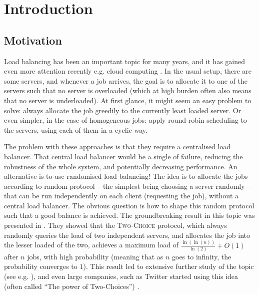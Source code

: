 \chapter{Introduction}\label{introduction}

\ifpdf
    \graphicspath{{Chapter1/Figs/Raster/}{Chapter1/Figs/PDF/}{Chapter1/Figs/}}
\else
    \graphicspath{{Chapter1/Figs/Vector/}{Chapter1/Figs/}}
\fi


\section{Motivation}

Load balancing has been an important topic for many years, and it has gained even more attention recently e.g. cloud computing \cite{mishra2020cloud}. In the usual setup, there are some servers, and whenever a job arrives, the goal is to allocate it to one of the servers such that no server is overloaded (which at high burden often also means that no server is underloaded). At first glance, it might seem an easy problem to solve: always allocate the job greedily to the currently least loaded server. Or even simpler, in the case of homogeneous jobs: apply round-robin scheduling to the servers, using each of them in a cyclic way. 

The problem with these approaches is that they require a centralised load balancer. That central load balancer would be a single of failure, reducing the robustness of the whole system, and potentially decreasing performance. An alternative is to use randomised load balancing! The idea is to allocate the jobs according to random protocol -- the simplest being choosing a server randomly -- that can be run independently on each client (requesting the job), without a central load balancer. The obvious question is how to shape this random protocol such that a good balance is achieved. The groundbreaking result in this topic was presented in \cite{azar1999twochoice}. They showed that the \textsc{Two-Choice} protocol, which always randomly queries the load of two independent servers, and allocates the job into the lesser loaded of the two, achieves a maximum load of $\frac{\ln(\ln(n))}{\ln(2)} + O(1)$ after $n$ jobs, with high probability (meaning that as $n$ goes to infinity, the probability converges to $1$). This result led to extensive further study of the topic (see e.g. \cite{richa2001surveytwochoice}), and even large companies, such as Twitter started using this idea (often called ``The power of Two-Choices'') \cite{anderson2019twitter}.


